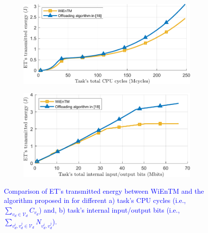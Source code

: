 \documentclass[12pt,draftclsnofoot,onecolumn]{IEEEtran}
\begin{document}
\begin{figure}
	\centering
	\begin{subfigure}[b]{.37\textwidth}
		\centering
		\includegraphics[width=\linewidth]{simulation2_a.pdf}
		\caption{} \label{fig:7a}
	\end{subfigure}
	\begin{subfigure}[b]{.37\textwidth}
		\centering
		\includegraphics[width=\linewidth]{simulation2_b.pdf}
		\caption{} \label{fig:7b}
	\end{subfigure}
	
	\caption{\textcolor{blue}{Comparison of ET's transmitted energy between WiEnTM and the algorithm proposed in \cite{b13} for different a) task's CPU cycles (i.e., $\sum_{v_d\in\mathcal{V}_d}C_{v_d}$) and, b) task's internal input/output bits (i.e., $\sum_{v_d^i,v_d^j\in\mathcal{V}_d}N_{v_d^i,v_d^j}$).}} \label{fig:7}
\end{figure}
\end{document}

